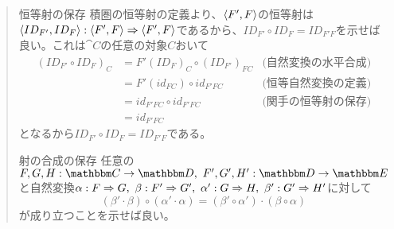 \begin{define}[関手を合成する関手]
\begin{quote}
\begin{mydescription}
\begin{center}
\begin{tikzpicture}[auto]
      \end{tikzpicture}
    \end{center}
		\item[恒等射の保存]積圏の恒等射の定義より、$\tuple{F',F}$の恒等射は$\nat{\tuple{ID_{F'},ID_{F}}}{\tuple{F',F}}{\tuple{F',F}}$であるから、$ID_{F'}\circ ID_{F}=ID_{F'F}$を示せば良い。これは$\cat{C}$の任意の対象$C$おいて
    \begin{align*}
      (ID_{F'}\circ ID_F)_C &= F'(ID_{F})_C\circ (ID_{F'})_{FC}&\text{(自然変換の水平合成)}\\
      &=F'(id_{FC})\circ id_{F'FC}&\text{(恒等自然変換の定義)}\\
      &=id_{F'FC}\circ id_{F'FC}&\text{(関手の恒等射の保存)}\\
      &=id_{F'FC}
    \end{align*}
    となるから$ID_{F'}\circ ID_{F}=ID_{F'F}$である。
		\item[射の合成の保存]任意の$\functor{F,G,H}{C}{D},\ \functor{F',G',H'}{D}{E}$と自然変換$\nat{\alpha}{F}{G},\ \nat{\beta}{F'}{G'},\ \nat{\alpha'}{G}{H},\ \nat{\beta'}{G'}{H'}$に対して
    \[(\beta'\cdot\beta)\circ(\alpha'\cdot\alpha)=(\beta'\circ\alpha')\cdot(\beta\circ\alpha)\]が成り立つことを示せば良い。
    \begin{center}
\end{center}
\end{mydescription}
\end{quote}
\end{define}
